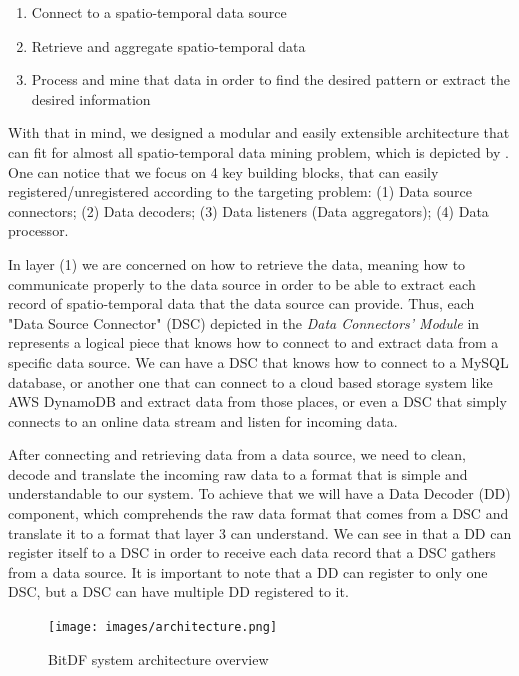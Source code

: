 \begin{enumerate}
    \item Connect to a spatio-temporal data source
    \item Retrieve and aggregate spatio-temporal data
    \item Process and mine that data in order to find the desired pattern or extract the desired information
\end{enumerate}

With that in mind, we designed a modular and easily extensible architecture that can fit for almost all spatio-temporal
data mining problem, which is depicted by . One can notice that we focus on 4 key building
blocks, that can easily registered/unregistered according to the targeting problem: (1) Data source connectors; (2)
Data decoders; (3) Data listeners (Data aggregators); (4) Data processor.

In layer (1) we are concerned on how to retrieve the data, meaning how to communicate properly to the data source in
order to be able to extract each record of spatio-temporal data that the data source can provide. Thus, each "Data
Source Connector" (DSC) depicted in the \textit{Data Connectors' Module} in  represents a
logical piece that knows how to connect to and extract data from a specific data source. We can have a DSC that knows
how to connect to a MySQL database, or another one that can connect to a cloud based storage system like AWS DynamoDB
and extract data from those places, or even a DSC that simply connects to an online data stream and listen for incoming
data.

After connecting and retrieving data from a data source, we need to clean, decode and translate the incoming raw data to
a format that is simple and understandable to our system. To achieve that we will have a Data Decoder (DD) component,
which comprehends the raw data format that comes from a DSC and translate it to a format that layer 3 can understand. We
can see in  that a DD can register itself to a DSC in order to receive each data record that a
DSC gathers from a data source. It is important to note that a DD can register to only one DSC, but a DSC can have
multiple DD registered to it.

\begin{figure}
    \centering
    \texttt{[image: images/architecture.png]}
    \caption{BitDF system architecture overview}
    \label{fig:architecture}
\end{figure}

